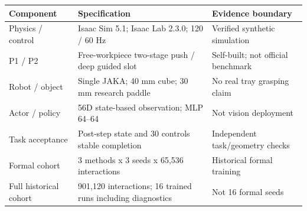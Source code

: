 \begin{tabular}{lp{5.5cm}p{4.3cm}}
\toprule
Component & Specification & Evidence boundary \\
\midrule
Physics / control & Isaac Sim 5.1; Isaac Lab 2.3.0; 120 / 60 Hz & Verified synthetic simulation \\
P1 / P2 & Free-workpiece two-stage push / deep guided slot & Self-built; not official benchmark \\
Robot / object & Single JAKA; 40 mm cube; 30 mm research paddle & No real tray grasping claim \\
Actor / policy & 56D state-based observation; MLP 64--64 & Not vision deployment \\
Task acceptance & Post-step state and 30 controls stable completion & Independent task/geometry checks \\
Formal cohort & 3 methods x 3 seeds x 65,536 interactions & Historical formal training \\
Full historical cohort & 901,120 interactions; 16 trained runs including diagnostics & Not 16 formal seeds \\
\bottomrule
\end{tabular}
